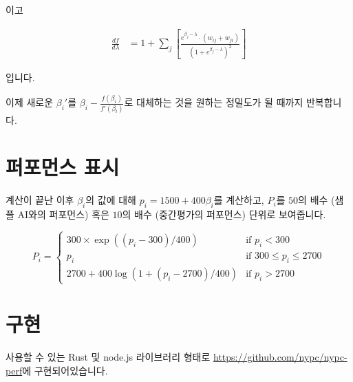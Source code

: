 \documentclass{article}
\begin{document}
이고

\begin{align*}
\frac{df}{d \lambda} & = 1 + \sum_j\left[\frac{e^{\beta_j - \lambda} \cdot (w_{ij} + w_{ji})}{(1+e^{\beta_j - \lambda})^2}\right]    
\end{align*}

입니다.

이제 새로운 $\beta_i' $를 $\beta_i - \frac{f(\beta_i)}{f'(\beta_i)}$로 대체하는 것을 원하는 정밀도가 될 때까지 반복합니다. 

\section{퍼포먼스 표시}
계산이 끝난 이후 $\beta_i$의 값에 대해 $p_i = 1500 + 400 \beta_i$를 계산하고, $P_i$를 $50$의 배수 (샘플 AI와의 퍼포먼스) 혹은 $10$의 배수 (중간평가의 퍼포먼스) 단위로 보여줍니다. 

\begin{equation*}
P_i =
\begin{cases}
300 \times \exp((p_i-300)/400) & \text{if  } p_i < 300 \\
p_i & \text{if  } 300 \le p_i \le 2700 \\
2700 + 400\log ( 1 + (p_i-2700)/400) & \text{if  } p_i > 2700 
\end{cases}
\end{equation*}

\section{구현}

사용할 수 있는 Rust 및 node.js 라이브러리 형태로 \url{https://github.com/nypc/nypc-perf}에 구현되어있습니다.

\printbibliography
\end{document}
